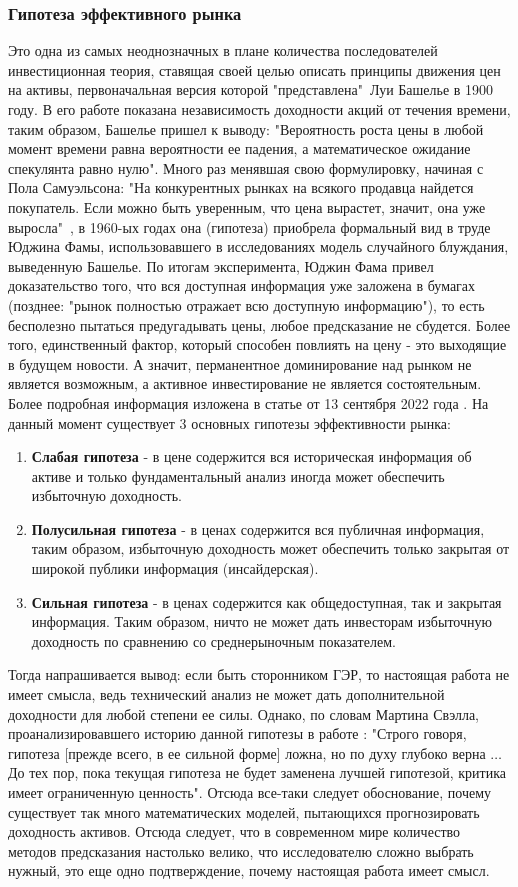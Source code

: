 		\subsubsection{Гипотеза эффективного рынка}
			Это одна из самых неоднозначных в плане количества последователей инвестиционная теория, ставящая своей целью описать принципы движения цен на активы, первоначальная версия которой "представлена"\ Луи Башелье в 1900 году. В его работе показана независимость доходности акций от течения времени, таким образом, Башелье пришел к выводу: "Вероятность роста цены в любой момент времени равна вероятности ее падения, а математическое ожидание спекулянта равно нулю". Много раз менявшая свою формулировку, начиная с Пола Самуэльсона: "На конкурентных рынках на всякого продавца найдется покупатель. Если можно быть уверенным, что цена вырастет, значит, она уже выросла"\ ,  в 1960-ых годах она (гипотеза) приобрела формальный вид в труде Юджина Фамы, использовавшего в исследованиях модель случайного блуждания, выведенную Башелье. По итогам эксперимента, Юджин Фама \cite{efficient_market} привел доказательство того, что вся доступная информация уже заложена в бумагах (позднее: "рынок полностью отражает всю доступную информацию"), то есть бесполезно пытаться предугадывать цены, любое предсказание не сбудется. Более того, единственный фактор, который способен повлиять на цену - это выходящие в будущем новости. А значит, перманентное доминирование над рынком не является возможным, а активное инвестирование не является состоятельным. Более подробная информация изложена в статье от 13 сентября 2022 года \cite{fama_market_efficiency}. На данный момент существует 3 основных гипотезы эффективности рынка:
			\begin{enumerate}
				\item \textbf{Слабая гипотеза} - в цене содержится вся историческая информация об активе и только фундаментальный анализ иногда может обеспечить избыточную доходность.
				\item \textbf{Полусильная гипотеза} - в ценах содержится вся публичная информация, таким образом, избыточную доходность может обеспечить только закрытая от широкой публики информация (инсайдерская).
				\item \textbf{Сильная гипотеза} - в ценах содержится как общедоступная, так и закрытая информация. Таким образом, ничто не может дать инвесторам избыточную доходность по сравнению со среднерыночным показателем.
			\end{enumerate}
			Тогда напрашивается вывод: если быть сторонником ГЭР, то настоящая работа не имеет смысла, ведь технический анализ не может дать дополнительной доходности для любой степени ее силы. Однако, по словам Мартина Свэлла, проанализировавшего историю данной гипотезы в работе \cite{matrin_swell}: "Строго говоря, гипотеза [прежде всего, в ее сильной форме] ложна, но по духу глубоко верна $\ldots$ До тех пор, пока текущая гипотеза не будет заменена лучшей гипотезой, критика имеет ограниченную ценность". Отсюда все-таки следует обоснование, почему существует так много математических моделей, пытающихся прогнозировать доходность активов. Отсюда следует, что в современном мире количество методов предсказания настолько велико, что исследователю сложно выбрать нужный, это еще одно подтверждение, почему настоящая работа имеет смысл.
